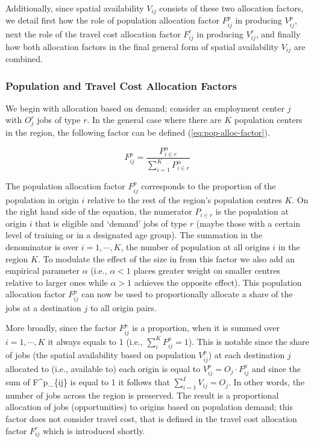 \documentclass[]{elsarticle} %
\begin{document}
Additionally, since spatial availability \(V_{ij}\) consists of these
two allocation factors, we detail first how the role of population
allocation factor \(F^p_{ij}\) in producing \(V^p_{ij}\), next the role
of the travel cost allocation factor \(F^c_{ij}\) in producing
\(V^c_{ij}\), and finally how both allocation factors in the final
general form of spatial availability \(V_{ij}\) are combined.

\hypertarget{population-and-travel-cost-allocation-factors}{%
\subsubsection{Population and Travel Cost Allocation
Factors}\label{population-and-travel-cost-allocation-factors}}

We begin with allocation based on demand; consider an employment center
\(j\) with \(O_j^r\) jobs of type \(r\). In the general case where there
are \(K\) population centers in the region, the following factor can be
defined (\ref{eq:pop-alloc-factor}).

\begin{equation}
\label{eq:pop-alloc-factor}
F^p_{ij} = \frac{P_{i\in r}^\alpha}{\sum_{i=1}^K P_{i\in r}^\alpha}
\end{equation}

The population allocation factor \(F^p_{ij}\) corresponds to the
proportion of the population in origin \(i\) relative to the rest of the
region's population centres \(K\). On the right hand side of the
equation, the numerator \(P_{i\in r}\) is the population at origin \(i\)
that is eligible and `demand' jobs of type \(r\) (maybe those with a
certain level of training or in a designated age group). The summation
in the denominator is over \(i=1,\cdots,K\), the number of population at
all origins \(i\) in the region \(K\). To modulate the effect of the
size in from this factor we also add an empirical parameter \(\alpha\)
(i.e., \(\alpha <1\) places greater weight on smaller centres relative
to larger ones while \(\alpha>1\) achieves the opposite effect). This
population allocation factor \(F^p_{ij}\) can now be used to
proportionally allocate a share of the jobs at a destination \(j\) to
all origin pairs.

More broadly, since the factor \(F^p_{ij}\) is a proportion, when it is
summed over \(i=1,\cdots,K\) it always equals to 1 (i.e.,
\(\sum_i^{K} F^p_{ij} = 1\)). This is notable since the share of jobs
(the spatial availability based on population \(V^p_{ij}\)) at each
destination \(j\) allocated to (i.e., available to) each origin is equal
to \(V^p_{ij} = O_j \cdot F^p_{ij}\) and since the sum of F\^{}p\_\{ij\}
is equal to 1 it follows that \(\sum_{i=1}^I V_{ij} = O_j\). In other
words, the number of jobs across the region is preserved. The result is
a proportional allocation of jobs (opportunities) to origins based on
population demand; this factor does not consider travel cost, that is
defined in the travel cost allocation factor \(F^c_{ij}\) which is
introduced shortly.
\end{document}

